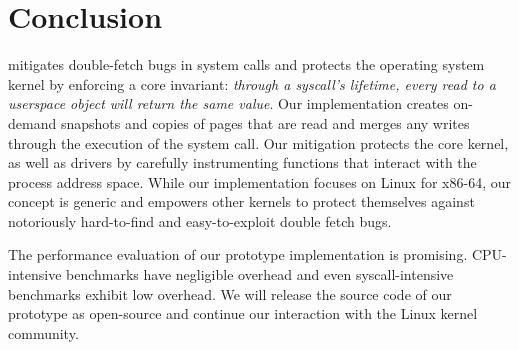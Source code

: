 \documentclass[letterpaper,twocolumn,10pt, anonymous]{article}
\begin{document}
\section{Conclusion}

\tiktok mitigates double-fetch bugs in system calls and protects the operating
system kernel by enforcing a core invariant:  \emph{through a syscall's
lifetime, every read to a userspace object will return the same value}.
Our \tiktok implementation creates on-demand snapshots and copies of pages that
are read and merges any writes through the execution of the system call.
%
Our mitigation protects the core kernel, as well as drivers by carefully
instrumenting functions that interact with the process address space. While our
implementation focuses on Linux for x86-64, our concept is generic and empowers
other kernels to protect themselves against notoriously hard-to-find and
easy-to-exploit double fetch bugs.

The performance evaluation of our prototype implementation is promising.
CPU-intensive benchmarks have negligible overhead and even syscall-intensive
benchmarks exhibit low overhead. We will release the source code of our
prototype as open-source and continue our interaction with the Linux kernel
community.




\end{document}
